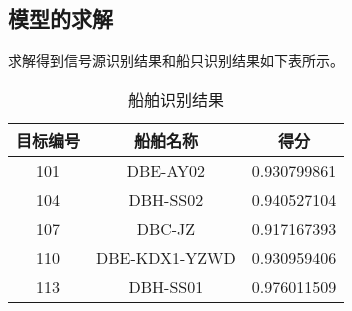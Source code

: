 \subsection{模型的求解}
求解得到信号源识别结果和船只识别结果如下表所示。
\begin{table}[htbp]
	\centering
	\caption{船舶识别结果}
	\begin{tabular}{ccc}
		\toprule
		目标编号		&	船舶名称			&	得分			\\
		\midrule
		101			&	DBE-AY02  		&	0.930799861	\\
		104			&	DBH-SS02     		&	0.940527104	\\
		107			&	DBC-JZ    		&	0.917167393	\\
		110			&	DBE-KDX1-YZWD	&	0.930959406	\\
		113			&	DBH-SS01		&	0.976011509	\\
		\bottomrule
	\end{tabular}
\end{table}
